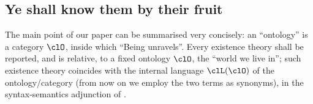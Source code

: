 





\subsection{Ye shall know them by their fruit}\label{frutti}
The main point of our paper can be summarised very concisely: an ``ontology'' is a category $\clO$, inside which ``Being unravels''. Every existence theory shall be reported, and is relative, to a fixed ontology $\clO$, the ``world we live in''; such existence theory coincides with the internal language $\clL(\clO)$ of the ontology/category (from now on we employ the two terms as synonyms), in the syntax\hyp{}semantics adjunction of \cite{syntax-semantics_duality}.


